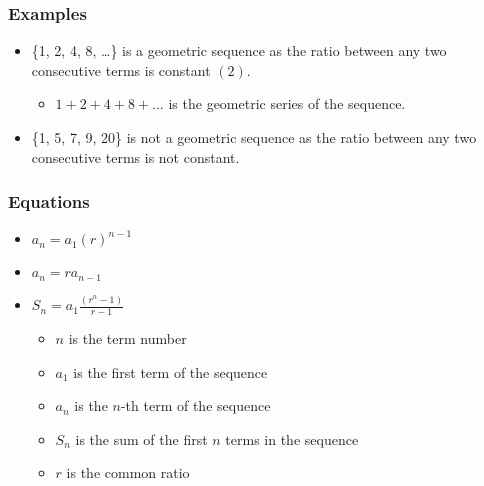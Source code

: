 \documentclass[12pt]{article}
\begin{document}
\subsubsection{Examples}
\begin{itemize}
    \item \{1, 2, 4, 8, \dots\} is a geometric sequence as the ratio between any two consecutive terms is constant $(2)$.
    \begin{itemize}
        \item $1 + 2 + 4 + 8 + \dots$ is the geometric series of the sequence.
    \end{itemize}
    \item \{1, 5, 7, 9, 20\} is not a geometric sequence as the ratio between any two consecutive terms is not constant.
\end{itemize}
\newpage
\subsubsection{Equations}
\begin{itemize}
    \item $a_n = a_1(r)^{n-1}$
    \item $a_n = ra_{n-1}$
    \item $S_n = a_1\frac{(r^n - 1)}{r - 1}$
    \begin{itemize}
        \item $n$ is the term number
        \item $a_1$ is the first term of the sequence
        \item $a_n$ is the $n$-th term of the sequence
        \item $S_n$ is the sum of the first $n$ terms in the sequence
        \item $r$ is the common ratio
    \end{itemize}
\end{itemize}
\end{document}
